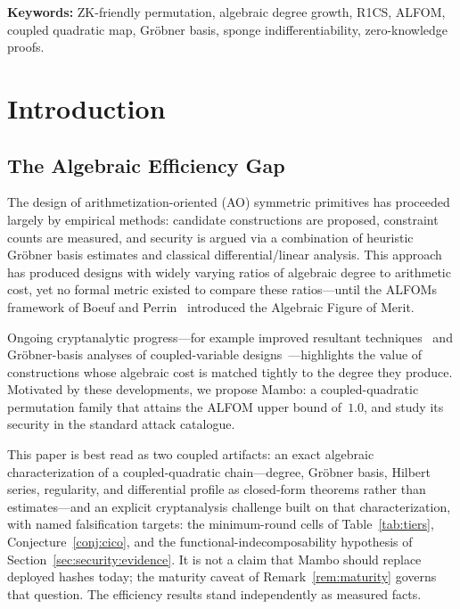 \documentclass[11pt,a4paper]{article}
\theoremstyle{definition}
\begin{document}
\medskip
\noindent\textbf{Keywords:} ZK-friendly permutation, algebraic degree growth,
R1CS, ALFOM, coupled quadratic map, Gr\"obner basis, sponge
indifferentiability, zero-knowledge proofs.

\section{Introduction}\label{sec:intro}

\subsection{The Algebraic Efficiency Gap}\label{sec:intro:gap}

The design of arithmetization-oriented (AO) symmetric primitives has
proceeded largely by empirical methods: candidate constructions are proposed,
constraint counts are measured, and security is argued via a combination of
heuristic Gr\"obner basis estimates and classical differential/linear
analysis. This approach has produced designs with widely varying ratios of
algebraic degree to arithmetic cost, yet no formal metric existed to compare
these ratios---until the ALFOMs framework of Boeuf and
Perrin~\cite{ALFOMs} introduced the Algebraic Figure of Merit.

Ongoing cryptanalytic progress---for example improved resultant
techniques~\cite{Griffin_break} and Gr\"obner-basis analyses of
coupled-variable designs~\cite{Anemoi_attack}---highlights the value of
constructions whose algebraic cost is matched tightly to the degree they
produce. Motivated by these developments, we propose Mambo: a
coupled-quadratic permutation family that attains the ALFOM upper bound
of~$1.0$, and study its security in the standard attack catalogue.

This paper is best read as two coupled artifacts: an exact algebraic
characterization of a coupled-quadratic chain---degree, Gr\"obner
basis, Hilbert series, regularity, and differential profile as
closed-form theorems rather than estimates---and an explicit
cryptanalysis challenge built on that characterization, with named
falsification targets: the minimum-round cells of
Table~\ref{tab:tiers}, Conjecture~\ref{conj:cico}, and the
functional-indecomposability hypothesis of
Section~\ref{sec:security:evidence}. It is not a claim that Mambo
should replace deployed hashes today; the maturity caveat of
Remark~\ref{rem:maturity} governs that question. The efficiency
results stand independently as measured facts.
\end{document}
